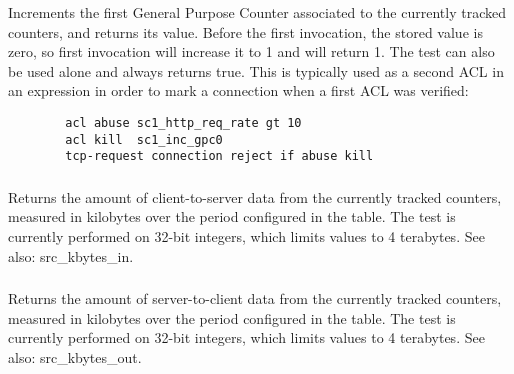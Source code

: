\subsubsection[sc1\_inc\_gpc0]{}
\subsubsection[sc2\_inc\_gpc0]{}
  Increments the first General Purpose Counter associated to the currently
  tracked counters, and returns its value. Before the first invocation, the
  stored value is zero, so first invocation will increase it to 1 and will
  return 1. The test can also be used alone and always returns true. This is
  typically used as a second ACL in an expression in order to mark a connection
  when a first ACL was verified:
  \begin{verbatim}
        acl abuse sc1_http_req_rate gt 10
        acl kill  sc1_inc_gpc0
        tcp-request connection reject if abuse kill
  \end{verbatim}

\subsubsection[sc1\_kbytes\_in]{}
\subsubsection[sc2\_kbytes\_in]{}
  Returns the amount of client-to-server data from the currently tracked
  counters, measured in kilobytes over the period configured in the table. The
  test is currently performed on 32-bit integers, which limits values to 4
  terabytes.
See also: src\_kbytes\_in.

\subsubsection[sc1\_kbytes\_out]{}
\subsubsection[sc2\_kbytes\_out]{}
  Returns the amount of server-to-client data from the currently tracked
  counters, measured in kilobytes over the period configured in the table. The
  test is currently performed on 32-bit integers, which limits values to 4
  terabytes.
See also: src\_kbytes\_out.

